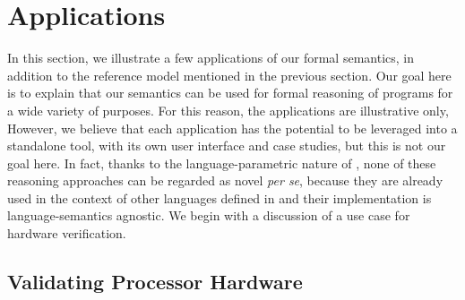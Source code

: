 \section{Applications} \label{sec:Appl}

In this section, we illustrate a few applications of our formal semantics, in addition to the reference model mentioned in the previous section.
Our goal here is to explain that our semantics can be used for formal reasoning of \ISA programs for a wide variety of purposes.
For this reason, the applications are illustrative only, 
However, we believe that each application has the potential to be leveraged into a standalone tool, with its own user interface and case studies, %
but this is not our goal here.
In fact, thanks to the language-parametric nature of \K, none of these reasoning approaches can be regarded as novel {\it per se}, because they are already used in the context of other languages defined in \K and their implementation is language-semantics agnostic.
%
We begin with a discussion of a use case for hardware verification.



\subsection{Validating Processor Hardware}
\label{sec:Appl:Processor}

